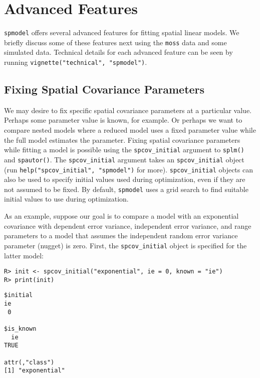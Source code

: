 \documentclass[10pt,letterpaper]{article}
\begin{document}
\hypertarget{sec:advfeatures}{%
\section{Advanced Features}\label{sec:advfeatures}}

\texttt{spmodel} offers several advanced features for fitting spatial
linear models. We briefly discuss some of these features next using the
\texttt{moss} data and some simulated data. Technical details for each
advanced feature can be seen by running
\texttt{vignette("technical",\ "spmodel")}.

\hypertarget{fixing-spatial-covariance-parameters}{%
\subsection{Fixing Spatial Covariance
Parameters}\label{fixing-spatial-covariance-parameters}}

We may desire to fix specific spatial covariance parameters at a
particular value. Perhaps some parameter value is known, for example. Or
perhaps we want to compare nested models where a reduced model uses a
fixed parameter value while the full model estimates the parameter.
Fixing spatial covariance parameters while fitting a model is possible
using the \texttt{spcov\_initial} argument to \texttt{splm()} and
\texttt{spautor()}. The \texttt{spcov\_initial} argument takes an
\texttt{spcov\_initial} object (run
\texttt{help("spcov\_initial",\ "spmodel")} for more).
\texttt{spcov\_initial} objects can also be used to specify initial
values used during optimization, even if they are not assumed to be
fixed. By default, \texttt{spmodel} uses a grid search to find suitable
initial values to use during optimization.

As an example, suppose our goal is to compare a model with an
exponential covariance with dependent error variance, independent error
variance, and range parameters to a model that assumes the independent
random error variance parameter (nugget) is zero. First, the
\texttt{spcov\_initial} object is specified for the latter model:

\begin{verbatim}
R> init <- spcov_initial("exponential", ie = 0, known = "ie")
R> print(init)
\end{verbatim}

\begin{verbatim}
$initial
ie 
 0 

$is_known
  ie 
TRUE 

attr(,"class")
[1] "exponential"
\end{verbatim}
\end{document}
